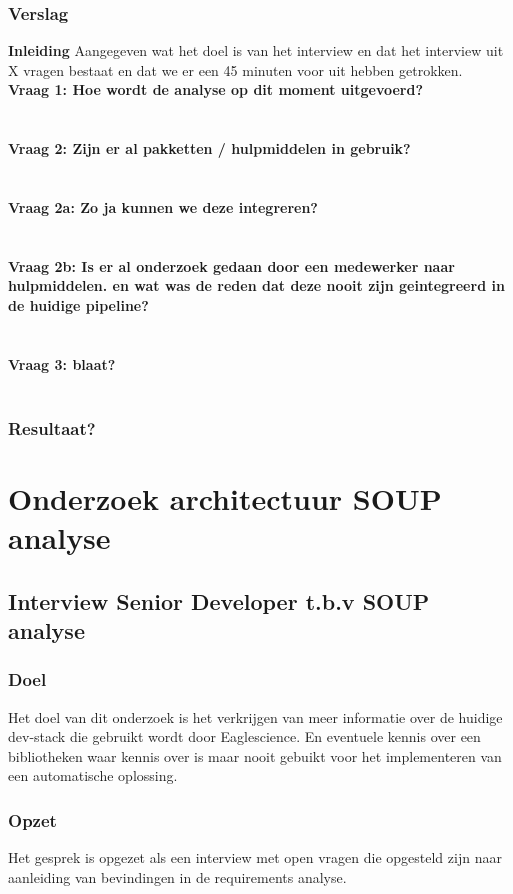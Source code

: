 \subsubsection{Verslag}
\textbf{Inleiding}
Aangegeven wat het doel is van het interview en dat het interview uit X vragen bestaat en dat we er een 45 minuten voor uit hebben getrokken.\\
\textbf{Vraag 1: Hoe wordt de analyse op dit moment uitgevoerd?}\\
\lipsum[01]\\
\\
\textbf{Vraag 2: Zijn er al pakketten / hulpmiddelen in gebruik?}\\
\lipsum[02]\\
\\
\textbf{Vraag 2a: Zo ja kunnen we deze integreren?}\\
\lipsum[03]\\
\\
\textbf{Vraag 2b: Is er al onderzoek gedaan door een medewerker naar hulpmiddelen. en wat was de reden dat deze nooit zijn geintegreerd in de huidige pipeline?}\\
\lipsum[04]\\
\\
\textbf{Vraag 3: blaat?}\\
\lipsum[05]\\

\subsubsection{Resultaat?}

\section{Onderzoek architectuur SOUP analyse}
\subsection{Interview Senior Developer t.b.v SOUP analyse}
\subsubsection{Doel}
Het doel van dit onderzoek is het verkrijgen van meer informatie over de huidige dev-stack die gebruikt wordt door Eaglescience. En eventuele kennis over een bibliotheken waar kennis over is maar nooit gebuikt voor het implementeren van een automatische oplossing.
\subsubsection{Opzet}
Het gesprek is opgezet als een interview met open vragen die opgesteld zijn naar aanleiding van bevindingen in de requirements analyse.
